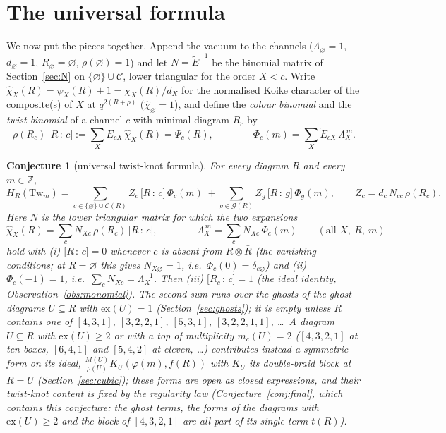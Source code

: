 \documentclass[11pt]{article}
\newtheorem{conjecture}{Conjecture}
\newcommand{\Tw}{\mathrm{Tw}}
\newcommand{\Lam}{\Lambda}
\newcommand{\Et}{\widetilde{E}}
\newcommand{\vac}{\varnothing}
\newcommand{\Chan}{\mathcal C}
\newcommand{\Rbar}{\bar R}
\newcommand{\chih}{\hat\chi}
\newcommand{\cf}[2]{\bigl[#1\,{:}\,#2\bigr]}
\newcommand{\Gh}{\mathcal G}
\begin{document}
\section{The universal formula}\label{sec:universal}

We now put the pieces together.  Append the vacuum to the channels ($\Lam_\vac=1$, $d_\vac=1$, $R_\vac=\varnothing$,
$\rho(\varnothing)=1$) and let $N=\Et^{-1}$ be the binomial matrix of Section~\ref{sec:N} on $\{\vac\}\cup\Chan$, lower
triangular for the order $X<c$.  Write $\chih_X(R)=\psi_X(R)+1=\chi_X(R)/d_X$ for the normalised Koike character of the
composite(s) of $X$ at $q^{2(R+\rho)}$ ($\chih_\vac=1$), and define the \emph{colour binomial} and the \emph{twist
binomial} of a channel $c$ with minimal diagram $R_c$ by
\begin{equation}\label{eq:binomdef}
\rho(R_c)\,\cf Rc:=\sum_X\Et_{cX}\,\chih_X(R)=\Psi_c(R),\qquad\qquad \Phi_c(m)=\sum_X\Et_{cX}\,\Lam_X^{\,m}.
\end{equation}

\begin{conjecture}[universal twist-knot formula]\label{conj:U}
For every diagram $R$ and every $m\in\mathbb Z$,
\begin{equation}\label{eq:U}
H_R(\Tw_m)=\sum_{c\in\{\vac\}\cup\Chan(R)}Z_c\,\cf Rc\,\Phi_c(m)\;+\sum_{g\in\Gh(R)}Z_g\,\cf Rg\,\Phi_g(m),\qquad
Z_c=d_c\,N_{cc}\,\rho(R_c).
\end{equation}
Here $N$ is the lower triangular matrix for which the two expansions
\begin{equation}\label{eq:twobinom}
\chih_X(R)=\sum_cN_{Xc}\,\rho(R_c)\,\cf Rc,\qquad\qquad \Lam_X^{\,m}=\sum_cN_{Xc}\,\Phi_c(m)\qquad(\text{all }X,\ R,\ m)
\end{equation}
hold with (i) $\cf Rc=0$ whenever $c$ is absent from $R\otimes\Rbar$ (the vanishing conditions; at $R=\varnothing$ this
gives $N_{X\vac}=1$, i.e.\ $\Phi_c(0)=\delta_{c\vac}$) and (ii) $\Phi_c(-1)=1$, i.e.\ $\sum_cN_{Xc}=\Lam_X^{-1}$.  Then
(iii) $\cf{R_c}c=1$ (the ideal identity, Observation~\ref{obs:monomial}).  The second sum runs over the ghosts of the
ghost diagrams $U\subseteq R$ with $\mathrm{ex}(U)=1$ (Section~\ref{sec:ghosts}); it is empty unless $R$ contains one of
$[4,3,1]$, $[3,2,2,1]$, $[5,3,1]$, $[3,2,2,1,1]$, \dots\ A diagram $U\subseteq R$ with $\mathrm{ex}(U)\ge2$ or with a top
of multiplicity $m_c(U)=2$ ($[4,3,2,1]$ at ten boxes, $[6,4,1]$ and $[5,4,2]$ at eleven, \dots) contributes instead a
symmetric form on its ideal, $\frac{M(U)}{\rho(U)}K_U(\varphi(m),f(R))$ with $K_U$ its double-braid block at $R=U$
(Section~\ref{sec:cubic}); these forms are open as closed expressions, and their twist-knot content is fixed by the
regularity law (Conjecture~\ref{conj:final}, which contains this conjecture: the ghost terms, the forms of the
diagrams with $\mathrm{ex}(U)\ge2$ and the block of $[4,3,2,1]$ are all part of its single term $t(R)$).
\end{conjecture}
\end{document}
